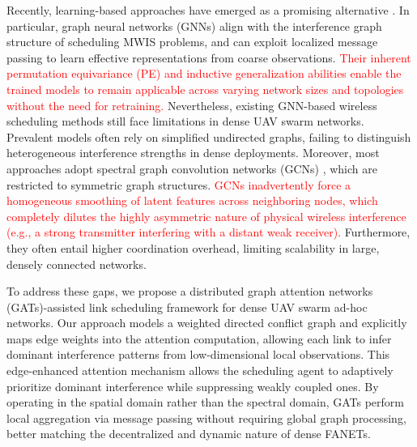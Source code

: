 \documentclass[journal]{IEEEtran}
\begin{document}
	Recently, learning-based approaches have emerged as a promising alternative \cite{JiangSurvey2022, ning2, spatialDL, graphEmbedding, zhaoSparsification}. In particular, graph neural networks (GNNs) align with the interference graph structure of scheduling MWIS problems, and can exploit localized message passing to learn effective representations from coarse observations. \textcolor{red}{Their inherent permutation equivariance (PE) and inductive generalization abilities enable the trained models to remain applicable across varying network sizes and topologies without the need for retraining.} Nevertheless, existing GNN-based wireless scheduling methods still face limitations in dense UAV swarm networks. Prevalent models often rely on simplified undirected graphs, failing to distinguish heterogeneous interference strengths in dense deployments. Moreover, most approaches adopt spectral graph convolution networks (GCNs) \cite{spatialDL, zhaoSparsification}, which are restricted to symmetric graph structures. \textcolor{red}{GCNs inadvertently force a homogeneous smoothing of latent features across neighboring nodes, which completely dilutes the highly asymmetric nature of physical wireless interference (e.g., a strong transmitter interfering with a distant weak receiver).} Furthermore, they often entail higher coordination overhead, limiting scalability in large, densely connected networks. 
	
	To address these gaps, we propose a distributed graph attention networks (GATs)-assisted link scheduling framework for dense UAV swarm ad-hoc networks. Our approach models a weighted directed conflict graph and explicitly maps edge weights into the attention computation, allowing each link to infer dominant interference patterns from low-dimensional local observations. This edge-enhanced attention mechanism allows the scheduling agent to adaptively prioritize dominant interference while suppressing weakly coupled ones. By operating in the spatial domain rather than the spectral domain, GATs perform local aggregation via message passing without requiring global graph processing, better matching the decentralized and dynamic nature of dense FANETs.
	
\end{document}
